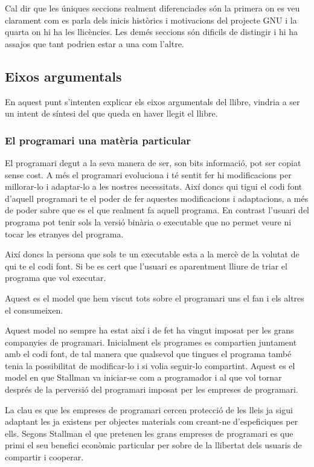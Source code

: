 \documentclass[a4paper,11pt]{scrartcl}
\begin{document}
Cal dir que les úniques seccions realment diferenciades són la primera on es veu
clarament com es parla dels inicis històrics i motivacions del projecte GNU i la quarta on hi ha les llicències.
Les demés seccions són dificils de distingir i hi ha assajos que tant podrien estar a una com l'altre.

  \subsection{Eixos argumentals}
  
En aquest punt s'intenten explicar els eixos argumentals del llibre, vindria a ser un intent
de síntesi del que queda en haver llegit el llibre.

\subsubsection{El programari una matèria particular}
El programari degut a la seva manera de ser, son bits informació, pot ser copiat sense cost.
A més el programari evoluciona i té sentit fer hi modificacions per millorar-lo i adaptar-lo
a les nostres necessitats. Així doncs qui tigui el codi font d'aquell programari te el 
poder de fer aquestes modificacions i adaptacions, a més de poder sabre que es el que
realment fa aquell programa. En contrast l'usuari del programa pot tenir sols la versió
binària o executable que no permet veure ni tocar les etranyes del programa.

Així doncs la persona que sols te un executable esta a la mercè de la volutat de qui
te el codi font. Si be es cert que l'usuari es aparentment lliure de triar el programa
que vol executar.

Aquest es el model que hem viscut tots sobre el programari uns el fan i els altres el 
consumeixen.

Aquest model no sempre ha estat així i de fet ha vingut imposat per les grans
companyies de programari. Inicialment els programes es compartien juntament
amb el codi font, de tal manera que qualsevol que tingues el programa també tenia
la possibilitat de modificar-lo i si volia seguir-lo compartint. Aquest es el model
en que Stallman va iniciar-se com a programador i al que vol tornar després
de la perversió del programari imposat per les empreses de programari.

La clau es que les empreses de programari cercen protecció de les lleis ja sigui
adaptant les ja existens per objectes materials com creant-ne d'espeficiques per ells.
Segons Stallman el que pretenen les grans empreses de programari es que primi el seu
benefici econòmic particular per sobre de la llibertat dels usuaris de compartir i
cooperar.
\end{document}
